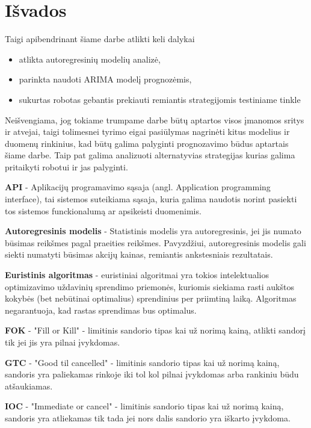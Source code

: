\documentclass{VUMIFInfKursinis}
\begin{document}
\section{Išvados}
Taigi apibendrinant šiame darbe atlikti keli dalykai
\begin{itemize}
  \item atlikta autoregresinių modelių analizė,
  \item parinkta naudoti ARIMA modelį prognozėmis,
  \item sukurtas robotas gebantis prekiauti remiantis strategijomis testiniame tinkle
\end{itemize}

Neišvengiama, jog tokiame trumpame darbe būtų aptartos visos įmanomos sritys ir atvejai, taigi tolimesnei tyrimo eigai pasiūlymas nagrinėti kitus modelius
ir duomenų rinkinius, kad būtų galima palyginti prognozavimo būdus aptartais šiame darbe. Taip pat galima analizuoti alternatyvias strategijas kurias galima
pritaikyti robotui ir jas palyginti. 


\textbf{API} - Aplikacijų programavimo sąsaja (angl. Application programming interface), tai sistemos suteikiama sąsaja, kuria galima naudotis norint pasiekti tos sistemos
funckionalumą ar apsikeisti duomenimis.

\textbf{Autoregresinis modelis} - Statistinis modelis yra autoregresinis, jei jis numato būsimas reikšmes pagal praeities reikšmes. Pavyzdžiui, autoregresinis modelis gali
siekti numatyti būsimas akcijų kainas, remiantis ankstesniais rezultatais.

\textbf{Euristinis algoritmas} - euristiniai algoritmai yra tokios intelektualios optimizavimo uždavinių sprendimo priemonės, kuriomis siekiama rasti aukštos
kokybės (bet nebūtinai optimalius) sprendinius per priimtiną laiką. Algoritmas negarantuoja, kad rastas sprendimas bus optimalus. \cite{misevivcius2009euristiniku}

\textbf{FOK} - "Fill or Kill" - limitinis sandorio tipas kai už norimą kainą, atlikti sandorį tik jei jis yra pilnai įvykdomas.

\textbf{GTC} - "Good til cancelled" - limitinis sandorio tipas kai už norimą kainą, sandoris yra paliekamas rinkoje iki tol kol pilnai įvykdomas arba rankiniu būdu atšaukiamas.

\textbf{IOC} - "Immediate or cancel" - limitinis sandorio tipas kai už norimą kainą, sandoris yra atliekamas tik tada jei nors dalis sandorio yra iškarto įvykdoma.
\end{document}
